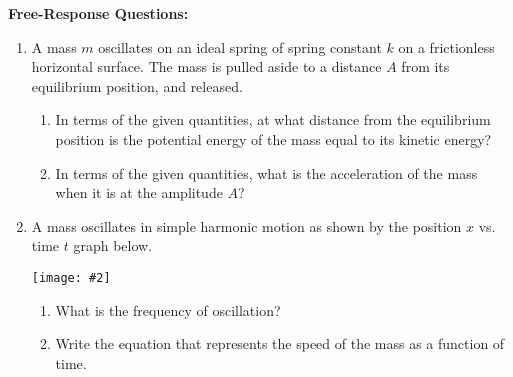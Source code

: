 \documentclass[12pt]{article}
\newcommand{\pic}[2]{\texttt{[image: \#2]}}
\begin{document}
\begin{enumerate}[leftmargin=50pt,label=\underline{\hspace{0.4in}} \arabic*.]
%
\end{enumerate}

\newpage
\noindent\textbf{Free-Response Questions:}

\begin{enumerate}[leftmargin=15pt]

\item A mass $m$ oscillates on an ideal spring of spring constant $k$ on a
  frictionless horizontal surface. The mass is pulled aside to a distance $A$
  from its equilibrium position, and released.
  \begin{center}
  \end{center} 
  \begin{enumerate}[noitemsep]  
  \item In terms of the given quantities, at what distance from the equilibrium
    position is the potential energy of the mass equal to its kinetic energy?
  \item In terms of the given quantities, what is the acceleration of the mass
    when it is at the amplitude $A$?
  \end{enumerate}
  \newpage
  
\item A mass oscillates in simple harmonic motion as shown by the position $x$
  vs. time $t$ graph below.
  \begin{center}
    \pic{.45}{oscillate.png}
  \end{center}
  \begin{enumerate}[noitemsep]  
  \item What is the frequency of oscillation?
  \item Write the equation that represents the speed of the mass as a function
    of time.
  \end{enumerate}
\end{enumerate}
\end{document}
